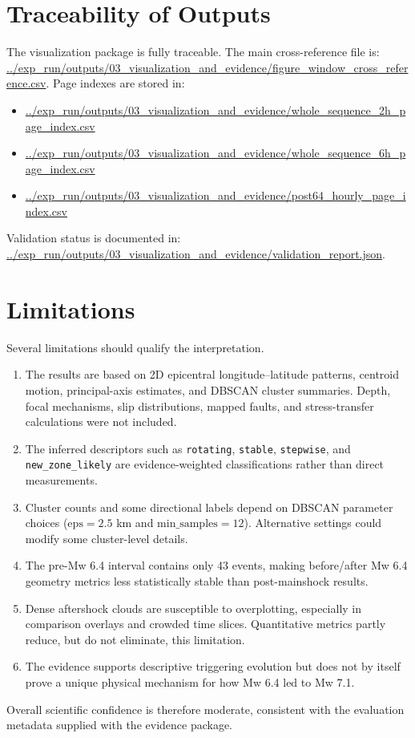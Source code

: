 \documentclass[11pt]{article}
\begin{document}
\section{Traceability of Outputs}
The visualization package is fully traceable. The main cross-reference file is:
\url{../exp_run/outputs/03_visualization_and_evidence/figure_window_cross_reference.csv}.
Page indexes are stored in:
\begin{itemize}[leftmargin=1.5em]
    \item \url{../exp_run/outputs/03_visualization_and_evidence/whole_sequence_2h_page_index.csv}
    \item \url{../exp_run/outputs/03_visualization_and_evidence/whole_sequence_6h_page_index.csv}
    \item \url{../exp_run/outputs/03_visualization_and_evidence/post64_hourly_page_index.csv}
\end{itemize}
Validation status is documented in:
\url{../exp_run/outputs/03_visualization_and_evidence/validation_report.json}.

\section{Limitations}
Several limitations should qualify the interpretation.
\begin{enumerate}[leftmargin=1.5em]
    \item The results are based on 2D epicentral longitude--latitude patterns, centroid motion, principal-axis estimates, and DBSCAN cluster summaries. Depth, focal mechanisms, slip distributions, mapped faults, and stress-transfer calculations were not included.
    \item The inferred descriptors such as \texttt{rotating}, \texttt{stable}, \texttt{stepwise}, and \texttt{new\_zone\_likely} are evidence-weighted classifications rather than direct measurements.
    \item Cluster counts and some directional labels depend on DBSCAN parameter choices ($\mathrm{eps}=2.5$ km and $\mathrm{min\_samples}=12$). Alternative settings could modify some cluster-level details.
    \item The pre-Mw 6.4 interval contains only 43 events, making before/after Mw 6.4 geometry metrics less statistically stable than post-mainshock results.
    \item Dense aftershock clouds are susceptible to overplotting, especially in comparison overlays and crowded time slices. Quantitative metrics partly reduce, but do not eliminate, this limitation.
    \item The evidence supports descriptive triggering evolution but does not by itself prove a unique physical mechanism for how Mw 6.4 led to Mw 7.1.
\end{enumerate}
Overall scientific confidence is therefore moderate, consistent with the evaluation metadata supplied with the evidence package.
\end{document}
